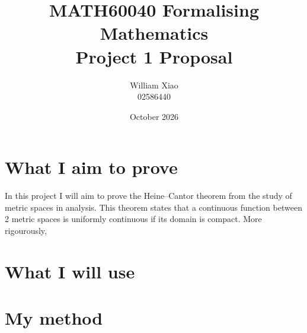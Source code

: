 \documentclass{article}
\title{MATH60040 Formalising Mathematics \\ Project 1 Proposal}
\author{William Xiao \\ 02586440}
\date{October 2026}
\begin{document}
\maketitle

\section{What I aim to prove}
In this project I will aim to prove the Heine--Cantor theorem from the study of metric spaces in analysis. This theorem states that a continuous function between 2 metric spaces is uniformly continuous if its domain is compact. More rigourously,

\section{What I will use}

\section{My method}
\end{document}
